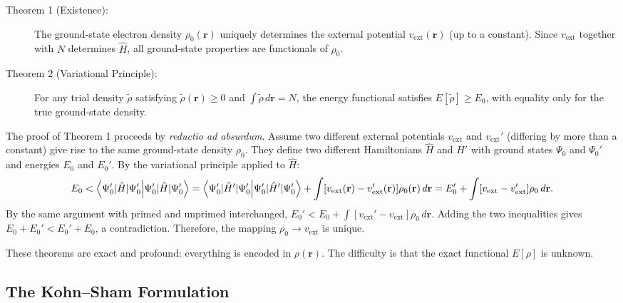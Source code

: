 \documentclass[11pt]{article}
\numberwithin{equation}{section}
\begin{document}
\begin{description}
\item[Theorem 1 (Existence):] The ground-state electron density $\rho_0(\mathbf{r})$ uniquely determines the external potential $v_\text{ext}(\mathbf{r})$ (up to a constant). Since $v_\text{ext}$ together with $N$ determines $\hat{H}$, all ground-state properties are functionals of $\rho_0$.

\item[Theorem 2 (Variational Principle):] For any trial density $\tilde{\rho}$ satisfying $\tilde{\rho}(\mathbf{r}) \geq 0$ and $\int\tilde{\rho}\,d\mathbf{r} = N$, the energy functional satisfies $E[\tilde{\rho}] \geq E_0$, with equality only for the true ground-state density.
\end{description}

The proof of Theorem 1 proceeds by \emph{reductio ad absurdum}. Assume two different external potentials $v_\text{ext}$ and $v_\text{ext}'$ (differing by more than a constant) give rise to the same ground-state density $\rho_0$. They define two different Hamiltonians $\hat{H}$ and $\hat{H}'$ with ground states $\Psi_0$ and $\Psi_0'$ and energies $E_0$ and $E_0'$. By the variational principle applied to $\hat{H}$:
\begin{equation}
E_0 < \braket{\Psi_0'|\hat{H}|\Psi_0'} = \braket{\Psi_0'|\hat{H}'|\Psi_0'} + \int [v_\text{ext}(\mathbf{r}) - v_\text{ext}'(\mathbf{r})]\rho_0(\mathbf{r})\,d\mathbf{r} = E_0' + \int [v_\text{ext} - v_\text{ext}']\rho_0\,d\mathbf{r}.
\end{equation}
By the same argument with primed and unprimed interchanged, $E_0' < E_0 + \int [v_\text{ext}' - v_\text{ext}]\rho_0\,d\mathbf{r}$. Adding the two inequalities gives $E_0 + E_0' < E_0' + E_0$, a contradiction. Therefore, the mapping $\rho_0 \to v_\text{ext}$ is unique.

These theorems are exact and profound: everything is encoded in $\rho(\mathbf{r})$. The difficulty is that the exact functional $E[\rho]$ is unknown.

\subsection{The Kohn--Sham Formulation}
\end{document}
